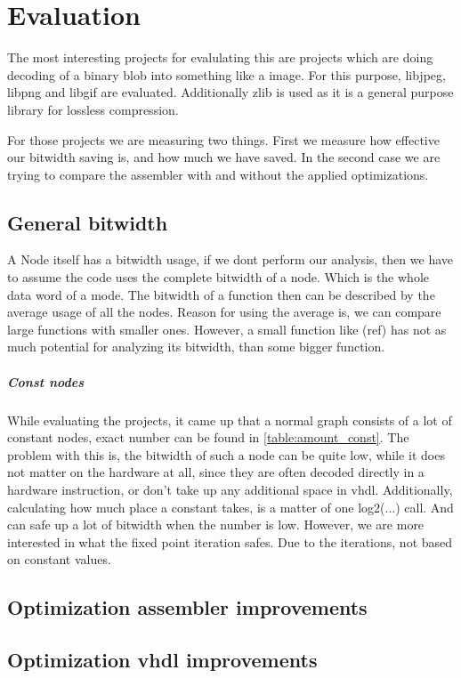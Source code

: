 \chapter{Evaluation}\label{sec:eval}

The most interesting projects for evalulating this are projects which are doing decoding of a binary blob into something like a image. For this purpose, libjpeg, libpng and libgif are evaluated. Additionally zlib is used as it is a general purpose library for lossless compression.

For those projects we are measuring two things. First we measure how effective our bitwidth saving is, and how much we have saved. In the second case we are trying to compare the assembler with and without the applied optimizations.

\section{General bitwidth}
A Node itself has a bitwidth usage, if we dont perform our analysis, then we have to assume the code uses the complete bitwidth of a node. Which is the whole data word of a mode.
The bitwidth of a function then can be described by the average usage of all the nodes. Reason for using the average is, we can compare large functions with smaller ones. However, a small function like (ref) has not as much potential for analyzing its bitwidth, than some bigger function.
\paragraph{Const nodes}

While evaluating the projects, it came up that a normal graph consists of a lot of constant nodes, exact number can be found in \autoref{table:amount_const}. The problem with this is, the bitwidth of such a node can be quite low, while it does not matter on the hardware at all, since they are often decoded directly in a hardware instruction, or don't take up any additional space in vhdl. Additionally, calculating how much place a constant takes, is a matter of one log2(...) call. And can safe up a lot of bitwidth when the number is low. However, we are more interested in what the fixed point iteration safes. Due to the iterations, not based on constant values.


\section{Optimization assembler improvements}
\section{Optimization vhdl improvements}
%